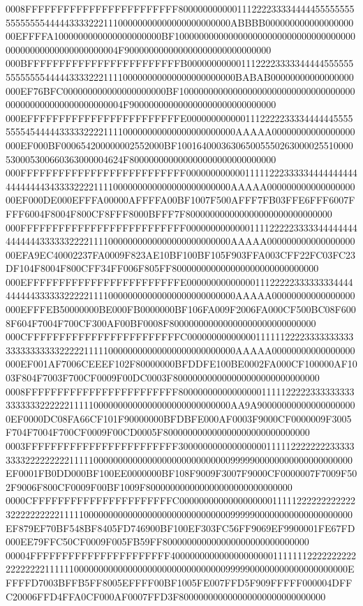0008FFFFFFFFFFFFFFFFFFFFFFFF8000000000001112222333344444555555555555555544444333322211100000000000000000000000ABBBB00000000000000000000EFFFFA1000000000000000000000BF100000000000000000000000000000000000000000000000000000000004F900000000000000000000000000000
000BFFFFFFFFFFFFFFFFFFFFFFFFB000000000001112222333334444455555555555555444443333222111100000000000000000000000BABAB00000000000000000000EF76BFC000000000000000000000BF100000000000000000000000000000000000000000000000000000000004F900000000000000000000000000000
000EFFFFFFFFFFFFFFFFFFFFFFFFE000000000000111222223333444444555555554544444333332222111100000000000000000000000AAAAA00000000000000000000EF000BF000654200000002552000BF100164000363065005550263000025510000530005300660363000004624F800000000000000000000000000000
000FFFFFFFFFFFFFFFFFFFFFFFFFF000000000000111112223333344444444444444444434333322221111000000000000000000000000AAAAA00000000000000000000EF000DE000EFFFA00000AFFFFA00BF1007F500AFFF7FB03FFE6FFF6007FFFF6004F8004F800CF8FFF8000BFFF7F800000000000000000000000000000
000FFFFFFFFFFFFFFFFFFFFFFFFFF000000000000011112222233333444444444444444333333222211110000000000000000000000000AAAAA00000000000000000000EFA9EC40002237FA0009F823AE10BF100BF105F903FFA003CFF22FC03FC23DF104F8004F800CFF34FF006F805FF800000000000000000000000000000
000EFFFFFFFFFFFFFFFFFFFFFFFFE000000000000001112222233333333444444444433333322222111100000000000000000000000000AAAAA00000000000000000000EFFFEB50000000BE000FB0000000BF106FA009F2006FA000CF500BC08F6008F604F7004F700CF300AF00BF0008F800000000000000000000000000000
000CFFFFFFFFFFFFFFFFFFFFFFFFC000000000000001111112222333333333333333333333222221111100000000000000000000000000AAAAA00000000000000000000EF001AF7006CEEEF102F80000000BFDDFE100BE0002FA000CF100000AF1003F804F7003F700CF0009F00DC0003F800000000000000000000000000000
0008FFFFFFFFFFFFFFFFFFFFFFFF8000000000000000011111222223333333333333333222222111110000000000000000000000000000AA9A900000000000000000000EF0000DC08FA66CF101F90000000BFDBFE000AF0003F9000CF0000009F3005F704F7004F700CF0009F00CD0005F800000000000000000000000000000
0003FFFFFFFFFFFFFFFFFFFFFFFF30000000000000000011111222222223333333332222222221111100000000000000000000000000009999900000000000000000000EF0001FB0DD000BF100EE0000000BF108F9009F3007F9000CF0000007F7009F502F9006F800CF0009F00BF1009F800000000000000000000000000000
0000CFFFFFFFFFFFFFFFFFFFFFFC00000000000000000001111122222222222232222222222111110000000000000000000000000000009999900000000000000000000EF879EF70BF548BF8405FD746900BF100EF303FC56FF9069EF9900001FE67FD000EE79FFC50CF0009F005FB59FF800000000000000000000000000000
00004FFFFFFFFFFFFFFFFFFFFFF400000000000000000000111111122222222222222222211111100000000000000000000000000000009999900000000000000000000EFFFFD7003BFFB5FF8005EFFFF00BF1005FE007FFD5F909FFFFF000004DFFC20006FFD4FFA0CF000AF0007FFD3F800000000000000000000000000000
